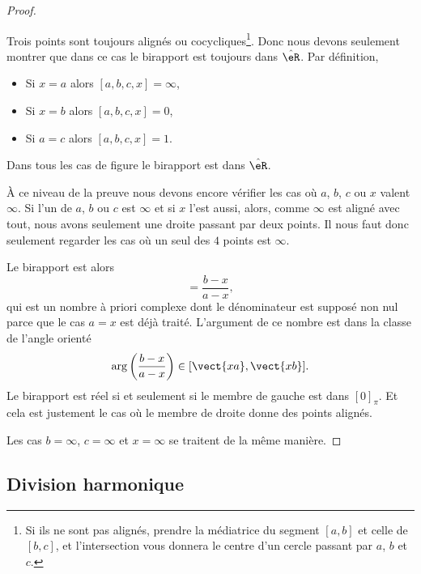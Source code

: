 \begin{proof}
\begin{subproof}
		Trois points sont toujours alignés ou cocycliques\footnote{Si ils ne sont pas alignés, prendre la médiatrice du segment \( [a,b]\) et celle de \( [b,c]\), et l'intersection vous donnera le centre d'un cercle passant par \( a\), \( b\) et \( c\).}. Donc nous devons seulement montrer que dans ce cas le birapport est toujours dans \( \hat \eR\). Par définition,
		\begin{itemize}
			\item Si \( x=a\) alors \( [a,b,c,x]=\infty\),
			\item Si \( x=b\) alors \( [a,b,c,x]=0\),
			\item Si \( a=c\) alors \( [a,b,c,x]=1\).
		\end{itemize}
		Dans tous les cas de figure le birapport est dans \( \hat \eR\).

	\end{subproof}

	À ce niveau de la preuve nous devons encore vérifier les cas où \( a\), \( b\), \( c\) ou \( x\) valent \( \infty\). Si l'un de \( a\), \( b\) ou \( c\) est \( \infty\) et si \( x\) l'est aussi, alors, comme \( \infty\) est aligné avec tout, nous avons seulement une droite passant par deux points. Il nous faut donc seulement regarder les cas où un seul des \( 4\) points est \( \infty\).

	\begin{subproof}
		\spitem[Si \( a=\infty\)]
		Le birapport est alors
		\begin{equation}
			[\infty,b,c,x]=\frac{ b-x }{ a-x },
		\end{equation}
		qui est un nombre à priori complexe dont le dénominateur est supposé non nul parce que le cas \( a=x\) est déjà traité. L'argument de ce nombre est dans la classe de l'angle orienté
		\begin{equation}
			\arg\left( \frac{ b-x }{ a-x } \right)\in[\vect{ xa },\vect{ xb }].
		\end{equation}
		Le birapport est réel si et seulement si le membre de gauche est dans \( [0]_{\pi}\). Et cela est justement le cas où le membre de droite donne des points alignés.
	\end{subproof}
	Les cas \( b=\infty\), \( c=\infty\) et \( x=\infty\) se traitent de la même manière.
\end{proof}

\subsection{Division harmonique}

